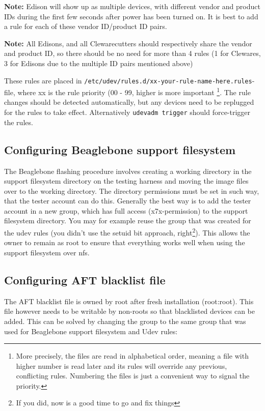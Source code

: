\documentclass[a4paper,11pt]{article}
\newcommand{\note}{\textbf{Note: }}
\newcommand{\cmd}[1]{\texttt{#1}}
\begin{document}
\note Edison will show up as multiple devices, with different vendor and product IDs during the first few seconds after power has been turned on. It is best to add a rule for each of these vendor ID/product ID pairs.

\note All Edisons, and all Clewarecutters should respectively share the vendor and product ID, so there should be no need for more than 4 rules (1 for Clewares, 3 for Edisons due to the multiple ID pairs mentioned above) 

These rules are placed in \cmd{/etc/udev/rules.d/xx-your-rule-name-here.rules}-file, where xx is the rule priority (00 - 99, higher is more important \footnote{More precisely, the files are read in alphabetical order, meaning a file with higher number is read later and its rules will override any previous, conflicting rules. Numbering the files is just a convenient way to signal the priority.}. The rule changes should be detected automatically, but any devices need to be replugged for the rules to take effect. Alternatively \cmd{udevadm trigger} should force-trigger the rules.

\subsection*{Configuring Beaglebone support filesystem}

The Beaglebone flashing procedure involves creating a working directory in the support filesystem directory on the testing harness and moving the image files over to the working directory. The directory permissions must be set in such way, that the tester account can do this. Generally the best way is to add the tester account in a new group, which has full access (x7x-permission) to the support filesystem directory. You may for example reuse the group that was created for the udev rules (you didn't use the setuid bit approach, right\footnote{If you did, now is a good time to go and fix things}). This allows the owner to remain as root to ensure that everything works well when using the support filesystem over nfs.

\subsection*{Configuring AFT blacklist file}

The AFT blacklist file is owned by root after fresh installation (root:root). This file however needs to be writable by non-roots so that blacklisted devices can be added. This can be solved by changing the group to the same group that was used for Beaglebone support filesystem and Udev rules:
\end{document}
